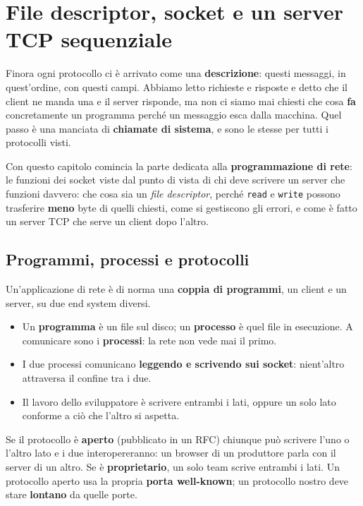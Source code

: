 \chapter{File descriptor, socket e un server TCP sequenziale}

Finora ogni protocollo ci è arrivato come una \textbf{descrizione}: questi messaggi, in quest'ordine, con questi campi.
Abbiamo letto richieste e risposte e detto che il client ne manda una e il server risponde, ma non ci siamo mai chiesti che
cosa \textbf{fa} concretamente un programma perché un messaggio esca dalla macchina. Quel passo è una manciata di
\textbf{chiamate di sistema}, e sono le stesse per tutti i protocolli visti.

Con questo capitolo comincia la parte dedicata alla \textbf{programmazione di rete}: le funzioni dei socket viste dal
punto di vista di chi deve scrivere un server che funzioni davvero: che cosa sia un \emph{file descriptor}, perché \texttt{read} e
\texttt{write} possono trasferire \textbf{meno} byte di quelli chiesti, come si gestiscono gli errori, e come è fatto un
server TCP che serve un client dopo l'altro.

\section{Programmi, processi e protocolli}

Un'applicazione di rete è di norma una \textbf{coppia di programmi}, un client e un server, su due end system diversi.
\begin{itemize}
    \item Un \textbf{programma} è un file sul disco; un \textbf{processo} è quel file in esecuzione. A comunicare sono i
          \textbf{processi}: la rete non vede mai il primo.
    \item I due processi comunicano \textbf{leggendo e scrivendo sui socket}: nient'altro attraversa il confine tra i due.
    \item Il lavoro dello sviluppatore è scrivere entrambi i lati, oppure un solo lato conforme a ciò che l'altro si aspetta.
\end{itemize}

Se il protocollo è \textbf{aperto} (pubblicato in un RFC) chiunque può scrivere l'uno o l'altro lato e i due
interopereranno: un browser di un produttore parla con il server di un altro. Se è \textbf{proprietario}, un solo team
scrive entrambi i lati. Un protocollo aperto usa la propria \textbf{porta well-known}; un protocollo nostro deve stare
\textbf{lontano} da quelle porte.

